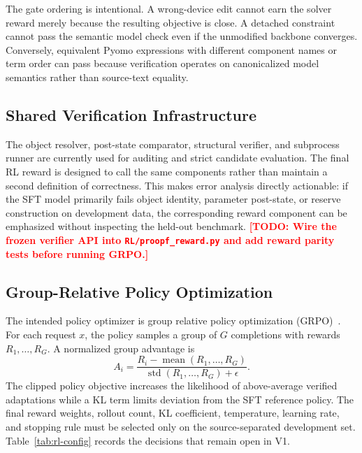 \documentclass[lettersize,journal]{IEEEtran}
\newcommand{\drafttodo}[1]{\textcolor{red}{\textbf{[TODO: #1]}}}
\begin{document}
The gate ordering is intentional. A wrong-device edit cannot earn the solver reward merely because the resulting objective is close. A detached constraint cannot pass the semantic model check even if the unmodified backbone converges. Conversely, equivalent Pyomo expressions with different component names or term order can pass because verification operates on canonicalized model semantics rather than source-text equality.

\subsection{Shared Verification Infrastructure}
The object resolver, post-state comparator, structural verifier, and subprocess runner are currently used for auditing and strict candidate evaluation. The final RL reward is designed to call the same components rather than maintain a second definition of correctness. This makes error analysis directly actionable: if the SFT model primarily fails object identity, parameter post-state, or reserve construction on development data, the corresponding reward component can be emphasized without inspecting the held-out benchmark. \drafttodo{Wire the frozen verifier API into \texttt{RL/proopf\_reward.py} and add reward parity tests before running GRPO.}

\subsection{Group-Relative Policy Optimization}
The intended policy optimizer is group relative policy optimization (GRPO)~\cite{shao2024deepseekmath}. For each request $x$, the policy samples a group of $G$ completions with rewards $R_1,\ldots,R_G$. A normalized group advantage is
\begin{equation}
A_i=\frac{R_i-\operatorname{mean}(R_1,\ldots,R_G)}
{\operatorname{std}(R_1,\ldots,R_G)+\epsilon}.
\end{equation}
The clipped policy objective increases the likelihood of above-average verified adaptations while a KL term limits deviation from the SFT reference policy. The final reward weights, rollout count, KL coefficient, temperature, learning rate, and stopping rule must be selected only on the source-separated development set. Table~\ref{tab:rl-config} records the decisions that remain open in V1.
\end{document}
